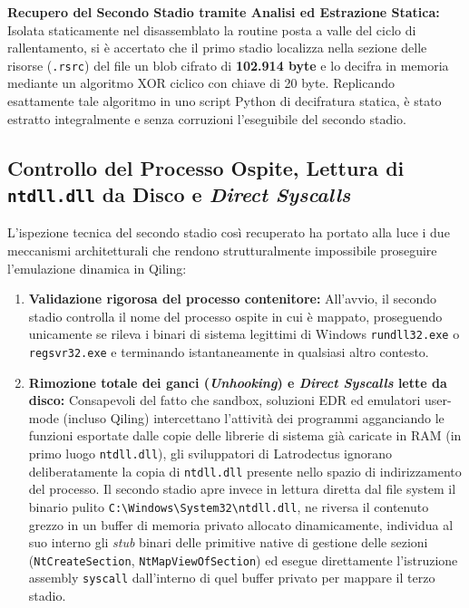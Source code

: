 \documentclass[11pt, a4paper]{article}
\begin{document}
\textbf{Recupero del Secondo Stadio tramite Analisi ed Estrazione Statica:} Isolata staticamente nel disassemblato la routine posta a valle del ciclo di rallentamento, si \`e accertato che il primo stadio localizza nella sezione delle risorse (\texttt{.rsrc}) del file un blob cifrato di \textbf{102.914 byte} e lo decifra in memoria mediante un algoritmo XOR ciclico con chiave di 20 byte. Replicando esattamente tale algoritmo in uno script Python di decifratura statica, \`e stato estratto integralmente e senza corruzioni l'eseguibile del secondo stadio.

\subsection{Controllo del Processo Ospite, Lettura di \texttt{ntdll.dll} da Disco e \textit{Direct Syscalls}}

L'ispezione tecnica del secondo stadio cos\`i recuperato ha portato alla luce i due meccanismi architetturali che rendono strutturalmente impossibile proseguire l'emulazione dinamica in Qiling:

\begin{enumerate}
	\item \textbf{Validazione rigorosa del processo contenitore:} All'avvio, il secondo stadio controlla il nome del processo ospite in cui \`e mappato, proseguendo unicamente se rileva i binari di sistema legittimi di Windows \texttt{rundll32.exe} o \texttt{regsvr32.exe} e terminando istantaneamente in qualsiasi altro contesto.
	\item \textbf{Rimozione totale dei ganci (\textit{Unhooking}) e \textit{Direct Syscalls} lette da disco:} Consapevoli del fatto che sandbox, soluzioni EDR ed emulatori user-mode (incluso Qiling) intercettano l'attivit\`a dei programmi agganciando le funzioni esportate dalle copie delle librerie di sistema gi\`a caricate in RAM (in primo luogo \texttt{ntdll.dll}), gli sviluppatori di Latrodectus ignorano deliberatamente la copia di \texttt{ntdll.dll} presente nello spazio di indirizzamento del processo. Il secondo stadio apre invece in lettura diretta dal file system il binario pulito \texttt{C:\textbackslash\allowbreak{}Windows\textbackslash\allowbreak{}System32\textbackslash\allowbreak{}ntdll.\allowbreak{}dll}, ne riversa il contenuto grezzo in un buffer di memoria privato allocato dinamicamente, individua al suo interno gli \textit{stub} binari delle primitive native di gestione delle sezioni (\texttt{Nt\allowbreak{}Create\allowbreak{}Section}, \texttt{Nt\allowbreak{}Map\allowbreak{}View\allowbreak{}Of\allowbreak{}Section}) ed esegue direttamente l'istruzione assembly \texttt{syscall} dall'interno di quel buffer privato per mappare il terzo stadio.
\end{enumerate}
\end{document}
